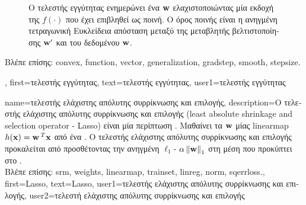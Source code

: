 {{\begin{figure}[H]
			{
			\caption{\foreignlanguage{greek}{Ο τελεστής εγγύτητας ενημερώνει ένα}  ${\bf w}$ 
				\foreignlanguage{greek}{ελαχιστοποιώντας μία εκδοχή της}  $f(\cdot)$ \foreignlanguage{greek}{που έχει 
				επιβληθεί ως ποινή. Ο όρος ποινής είναι η ανηγμένη τετραγωνική Ευκλείδεια απόσταση μεταξύ της μεταβλητής 
				βελτιστοποίησης ${\bf w}'$ και του δεδομένου}  ${\bf w}$.	\label{fig_proxoperator_opt_dict}} }
		\end{figure}
		\foreignlanguage{greek}{Βλέπε επίσης:} \gls{convex}, \gls{function}, \gls{vector}, \gls{generalization}, \gls{gradstep}, \gls{smooth}, \gls{stepsize}.},
	first={\foreignlanguage{greek}{τελεστής εγγύτητας}},
	text={\foreignlanguage{greek}{τελεστής εγγύτητας}},
	user1={\foreignlanguage{greek}{τελεστής εγγύτητας}} %
}

{name={\foreignlanguage{greek}{τελεστής ελάχιστης απόλυτης συρρίκνωσης και επιλογής}}, 
	description={\foreignlanguage{greek}{Ο τελεστής ελάχιστης απόλυτης συρρίκνωσης και 
		επιλογής} 
		(least absolute shrinkage and selection operator - Lasso)
		\foreignlanguage{greek}{είναι μία περίπτωση} . \foreignlanguage{greek}{Μαθαίνει τα} 
		 ${\bf w}$ \foreignlanguage{greek}{μίας} \gls{linearmap} 
		$h({\bf x}) = {\bf w}\,^{T} {\bf x}$ \foreignlanguage{greek}{από ένα} . 
		\foreignlanguage{greek}{Ο τελεστής ελάχιστης απόλυτης συρρίκνωσης και επιλογής προκαλείται από} 
		 \foreignlanguage{greek}{προσθέτοντας την ανηγμένη} $\ell_{1}$- 
		$\alpha \left\Vert {{\bf w}} \right\Vert_{1}$ \foreignlanguage{greek}{στη μέση}  
		\foreignlanguage{greek}{που προκύπτει στο} .\\
		\foreignlanguage{greek}{Βλέπε επίσης:} \gls{srm}, \gls{weights}, \gls{linearmap}, \gls{trainset}, \gls{linreg}, \gls{norm}, \gls{sqerrloss}.},
	first={Lasso},
	text={Lasso},
	user1={\foreignlanguage{greek}{τελεστής ελάχιστης απόλυτης συρρίκνωσης και επιλογής}}, %
  	user2={\foreignlanguage{greek}{τελεστή ελάχιστης απόλυτης συρρίκνωσης και επιλογής}} %
}

